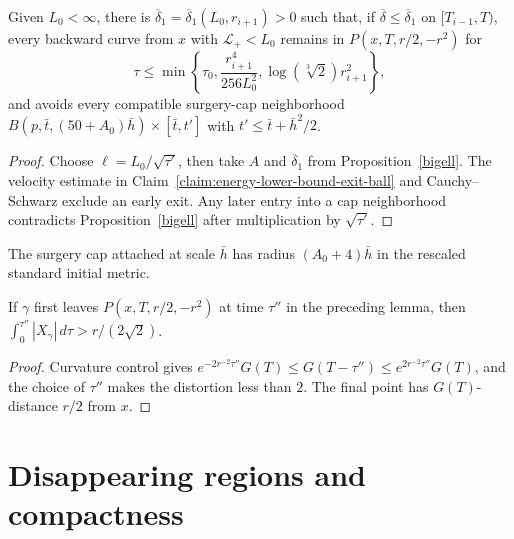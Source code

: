 \begin{lemma}
\label{lem:small-L-plus-avoids-surgery-caps}
\label{L_0}
Given $L_0<\infty$, there is $\overline\delta_1=\overline\delta_1(L_0,r_{i+1})>0$ such that, if $\overline\delta\leq\overline\delta_1$ on $[T_{i-1},T)$, every backward curve from $x$ with $\mathcal L_+<L_0$ remains in $P(x,T,r/2,-r^2)$ for
\[
\tau\leq\min\left\{\tau_0,\frac{r_{i+1}^4}{256L_0^2},\log(\sqrt[3]2)r_{i+1}^2\right\},
\]
and avoids every compatible surgery-cap neighborhood $B(p,\bar t,(50+A_0)\bar h)\times[\bar t,t']$ with $t'\leq\bar t+\bar h^2/2$.
\end{lemma}
\label{tau_1est}
\begin{proof}
\sketch
{}
Choose $\ell=L_0/\sqrt{\tau'}$, then take $A$ and $\overline\delta_1$ from Proposition~\ref{bigell}. The velocity estimate in Claim~\ref{claim:energy-lower-bound-exit-ball} and Cauchy--Schwarz exclude an early exit. Any later entry into a cap neighborhood contradicts Proposition~\ref{bigell} after multiplication by $\sqrt{\tau'}$.
\end{proof}

\begin{remark}
\label{rem:surgery-cap-radius-recollection}

The surgery cap attached at scale $\bar h$ has radius $(A_0+4)\bar h$ in the rescaled standard initial metric.
\end{remark}

\begin{claim}
\label{claim:energy-lower-bound-exit-ball}
If $\gamma$ first leaves $P(x,T,r/2,-r^2)$ at time $\tau''$ in the preceding lemma, then $\int_0^{\tau''}|X_\gamma|\,d\tau>r/(2\sqrt2)$.
\end{claim}
\begin{proof}
\sketch Curvature control gives $e^{-2r^{-2}\tau''}G(T)\leq G(T-\tau'')\leq e^{2r^{-2}\tau''}G(T)$, and the choice of $\tau''$ makes the distortion less than $2$. The final point has $G(T)$-distance $r/2$ from $x$.
\end{proof}

\section{Disappearing regions and compactness}

